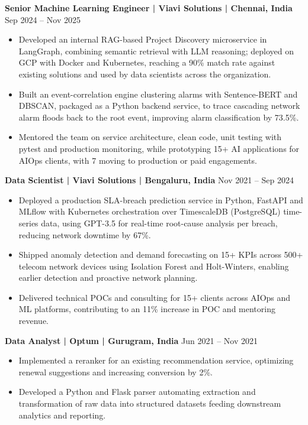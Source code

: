 \documentclass[10pt,a4paper]{article}
\newcommand{\role}[2]{\textbf{#1} \hfill #2\par}
\begin{document}
\role{Senior Machine Learning Engineer | Viavi Solutions | Chennai, India}{Sep 2024 -- Nov 2025}
\begin{itemize}
  \item Developed an internal RAG-based Project Discovery microservice in LangGraph, combining semantic retrieval
  with LLM reasoning; deployed on GCP with Docker and Kubernetes, reaching a 90\% match rate against existing
  solutions and used by data scientists across the organization.
  \item Built an event-correlation engine clustering alarms with Sentence-BERT and DBSCAN, packaged as a Python
  backend service, to trace cascading network alarm floods back to the root event, improving alarm classification
  by 73.5\%.
  \item Mentored the team on service architecture, clean code, unit testing with pytest and production monitoring,
  while prototyping 15+ AI applications for AIOps clients, with 7 moving to production or paid engagements.
\end{itemize}
\vspace{3pt}

\role{Data Scientist | Viavi Solutions | Bengaluru, India}{Nov 2021 -- Sep 2024}
\begin{itemize}
  \item Deployed a production SLA-breach prediction service in Python, FastAPI and MLflow with Kubernetes
  orchestration over TimescaleDB (PostgreSQL) time-series data, using GPT-3.5 for real-time root-cause analysis
  per breach, reducing network downtime by 67\%.
  \item Shipped anomaly detection and demand forecasting on 15+ KPIs across 500+ telecom network devices using
  Isolation Forest and Holt-Winters, enabling earlier detection and proactive network planning.
  \item Delivered technical POCs and consulting for 15+ clients across AIOps and ML platforms, contributing to an
  11\% increase in POC and mentoring revenue.
\end{itemize}
\vspace{3pt}

\role{Data Analyst | Optum | Gurugram, India}{Jun 2021 -- Nov 2021}
\begin{itemize}
  \item Implemented a reranker for an existing recommendation service, optimizing renewal suggestions and
  increasing conversion by 2\%.
  \item Developed a Python and Flask parser automating extraction and transformation of raw data into structured
  datasets feeding downstream analytics and reporting.
\end{itemize}
\vspace{3pt}
\end{document}
